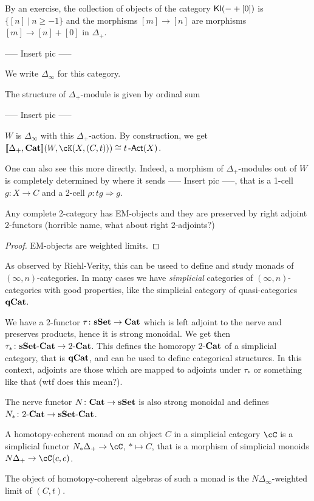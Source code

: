 \documentclass[a4paper,11pt,oneside,openany]{scrbook}
\begin{document}
By an exercise, the collection of objects of the category $\operatorname{\mathsf{Kl}}(-+[0])$ is
$\{[n]\ |\ n\geq -1\}$ and the morphisms $[m]\rightarrow[n]$ are morphisms
$[m]\rightarrow[n]+[0]$ in $\Delta_+$.

----- Insert pic -----

We write $\Delta_\infty$ for this category.

The structure of $\Delta_+$-module is given by ordinal sum

----- Insert pic -----

$W$ is $\Delta_\infty$ with this $\Delta_+$-action. By construction, we get
$[\![\Delta_+,\Cat]\!](W,\cK(X,(C,t)))\cong t\Act(X)$.

One can also see this more directly. Indeed, a morphism of $\Delta_+$-modules
out of $W$ is completely determined by where it sends ----- Insert pic -----,
that is a 1-cell $g\colon X\rightarrow C$ and a 2-cell $\rho\colon tg\Rightarrow
	g$.

\begin{cor}
	Any complete 2-category has EM-objects and they are preserved by right
	adjoint 2-functors (horrible name, what about right 2-adjoints?)
\end{cor}
\begin{proof}
	EM-objects are weighted limits.
\end{proof}

As observed by Riehl-Verity, this can be useed to define and study monads of
$(\infty,n)$-categories. In many cases we have \emph{simplicial} categories of
$(\infty,n)$-categories with good properties, like the simplicial
category of quasi-categories ${\normalfont\textbf{qCat}}$.

We have a 2-functor $\tau\colon{\normalfont\textbf{sSet}}\rightarrow{\normalfont\textbf{Cat}}$ which is left adjoint to
the nerve and preserves products, hence it is strong monoidal. We get then
$\tau_*\colon{\normalfont\textbf{sSet}}\mbox{-}{\normalfont\textbf{Cat}}\rightarrow 2\mbox{-}{\normalfont\textbf{Cat}}$. This defines the
homoropy 2-${\normalfont\textbf{Cat}}$ of a simplicial category, that is ${\normalfont\textbf{qCat}}$, and can be used to
define categorical structures. In this context, adjoints are those which are
mapped to adjoints under $\tau_*$ or something like that (wtf does this mean?).

The nerve functor $N\colon{\normalfont\textbf{Cat}}\rightarrow{\normalfont\textbf{sSet}}$ is also strong monoidal and
defines $N_*\colon 2\mbox{-}{\normalfont\textbf{Cat}}\rightarrow{\normalfont\textbf{sSet}}\mbox{-}{\normalfont\textbf{Cat}}$.

\begin{defn}
	A homotopy-coherent monad on an object $C$ in a simplicial category $\cC$ is
	a simplicial functor $N_*\Delta_+\rightarrow\cC$, $*\mapsto C$, that
	is a morphism of simplicial monoids $N\Delta_+\rightarrow\cC(c,c)$.

	The object of homotopy-coherent algebras of such a monad is the
	$N\Delta_\infty$-weighted limit of $(C,t)$.
\end{defn}
\end{document}

